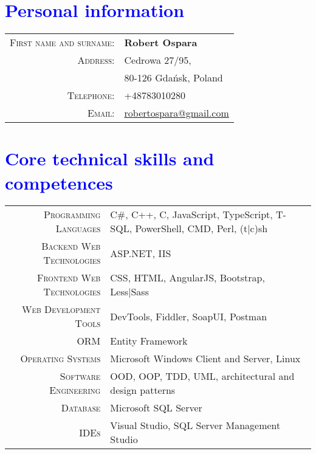 \documentclass[a4paper,12pt]{article}
\begin{document}
\par{\bigskip\par}


\section{\textcolor{Blue}{Personal information}}

\begin{tabular}{rl}
	\textsc{First name and surname:}&  \textbf{Robert Ospara} \\
	\textsc{Address:}& Cedrowa 27/95, \\
	\textsc{}& 80-126 Gdańsk, Poland \\
	\textsc{Telephone:}& +48783010280 \\
	\textsc{Email:}& \href{mailto:robertospara@gmail.com}{robertospara@gmail.com}
\end{tabular}

\vspace{3em}

\section{\textcolor{Blue}{Core technical skills and competences}}
\begin{tabular}{r|p{9.5cm}}
	\textsc{Programming Languages}
	&\footnotesize{C\#, C++, C, JavaScript, TypeScript, T-SQL, PowerShell, CMD, Perl, (t|c)sh} \\
	\textsc{Backend Web Technologies}
	&\footnotesize{ASP.NET, IIS} \\
	\textsc{Frontend Web Technologies}
	&\footnotesize{CSS, HTML, AngularJS, Bootstrap, Less|Sass} \\
	\textsc{Web Development Tools}
	&\footnotesize{DevTools, Fiddler, SoapUI, Postman} \\
	\textsc{ORM}
	&\footnotesize{Entity Framework} \\
	\textsc{Operating Systems}
	&\footnotesize{Microsoft Windows Client and Server, Linux} \\
	\textsc{Software Engineering}
	&\footnotesize{OOD, OOP, TDD, UML, architectural and design patterns} \\
	\textsc{Database}
	&\footnotesize{Microsoft SQL Server} \\
	\textsc{IDEs}
	&\footnotesize{Visual Studio, SQL Server Management Studio} \\
\end{tabular}
\end{document}
